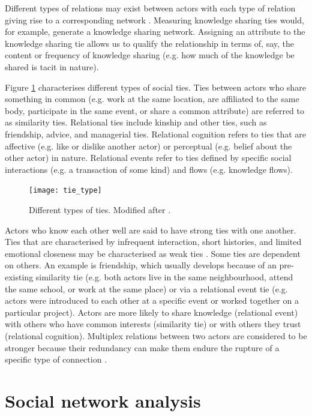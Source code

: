 Different types of relations may exist between actors with each type of relation giving rise to a corresponding network \citep{borgatti2013analyzing}. Measuring knowledge sharing ties would, for example, generate a knowledge sharing network. Assigning an attribute to the knowledge sharing tie allows us to qualify the relationship in terms of, say, the content or frequency of knowledge sharing (e.g. how much of the knowledge be shared is tacit in nature). \medskip

Figure \ref{fig:tie_type} characterises different types of social ties. Ties between actors who share something in common (e.g. work at the same location, are affiliated to the same body, participate in the same event, or share a common attribute) are referred to as similarity ties. Relational ties include kinship and other ties, such as friendship, advice, and managerial ties. Relational cognition refers to ties that are affective (e.g. like or dislike another actor) or perceptual (e.g. belief about the other actor) in nature. Relational events refer to ties defined by specific social interactions (e.g. a transaction of some kind) and flows (e.g. knowledge flows). \medskip

\begin{figure}
	\centering
	\texttt{[image: tie\_type]}
	\caption{Different types of ties. Modified after \citet{borgatti2009network}.}
	\label{fig:tie_type}
\end{figure}

Actors who know each other well are said to have strong ties with one another. Ties that are characterised by infrequent interaction, short histories, and limited emotional closeness may be characterised as weak ties \citep{baer2010strength}. Some ties are dependent on others. An example is friendship, which usually develops because of an pre-existing similarity tie (e.g. both actors live in the same neighbourhood, attend the same school, or work at the same place) or via a relational event tie (e.g. actors were introduced to each other at a specific event or worked together on a particular project). Actors are more likely to share knowledge (relational event) with others who have common interests (similarity tie) or with others they trust (relational cognition). Multiplex relations between two actors are considered to be stronger because their redundancy can make them endure the rupture of a specific type of connection \citep{dickison2016multilayer}. \medskip 

\section{Social network analysis}

